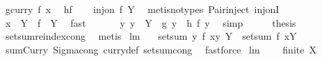 \begin{isabellebody}
\ {\isacharquery}g{\isacharequal}{\isachardoublequoteopen}{\isacharparenleft}curry\ f{\isacharparenright}\ x{\isachardoublequoteclose}\ \isamarkupfalse%
\ {\isacharquery}h{\isacharequal}f\isanewline
\ \ \isamarkupfalse%
\ {\isachardoublequoteopen}inj{\isacharunderscore}on\ {\isacharquery}f\ Y{\isachardoublequoteclose}\ \isamarkupfalse%
\ {\isacharparenleft}metis{\isacharparenleft}no{\isacharunderscore}types{\isacharparenright}\ Pair{\isacharunderscore}inject\ inj{\isacharunderscore}onI{\isacharparenright}\ \isanewline
\ \ \isamarkupfalse%
\ \isamarkupfalse%
\ {\isachardoublequoteopen}{\isacharbraceleft}x{\isacharbraceright}\ {\isasymtimes}\ Y\ {\isacharequal}\ {\isacharquery}f\ {\isacharbackquote}\ Y{\isachardoublequoteclose}\ \isamarkupfalse%
\ fast\isanewline
\ \ \isamarkupfalse%
\ \isamarkupfalse%
\ {\isachardoublequoteopen}{\isasymforall}\ y{\isachardot}\ y\ {\isasymin}\ Y\ {\isasymlongrightarrow}\ {\isacharquery}g\ y\ {\isacharequal}\ {\isacharquery}h\ {\isacharparenleft}{\isacharquery}f\ y{\isacharparenright}{\isachardoublequoteclose}\ \isamarkupfalse%
\ simp\isanewline
\ \ \isamarkupfalse%
\ \isamarkupfalse%
\ {\isacharquery}thesis\ \isamarkupfalse%
\ setsum{\isachardot}reindex{\isacharunderscore}cong\ \isamarkupfalse%
\ metis\isanewline
{}\isamarkupfalse%
%
\endisatagproof
{\isafoldproof}%
%
\isadelimproof
\isanewline
%
\endisadelimproof
\isanewline
{}\isamarkupfalse%
\ lm{}{}{}{\isacharcolon}\ \isanewline
\ \ {\isachardoublequoteopen}setsum\ {\isacharparenleft}{\isacharpercent}y{\isachardot}\ f\ {\isacharparenleft}x{\isacharcomma}y{\isacharparenright}{\isacharparenright}\ Y\ {\isacharequal}\ setsum\ f\ {\isacharparenleft}{\isacharbraceleft}x{\isacharbraceright}{\isasymtimes}Y{\isacharparenright}{\isachardoublequoteclose}\ \isanewline
%
\isadelimproof
\ \ %
\endisadelimproof
%
\isatagproof
{}\isamarkupfalse%
\ sumCurry\ Sigma{\isacharunderscore}cong\ curry{\isacharunderscore}def\ setsum{\isachardot}cong\ \isamarkupfalse%
\ fastforce%
\endisatagproof
{\isafoldproof}%
%
\isadelimproof
\isanewline
%
\endisadelimproof
\isanewline
{}\isamarkupfalse%
\ lm{}{}{}{\isacharcolon}\ \isanewline
\ \ \ {\isachardoublequoteopen}finite\ X{\isachardoublequoteclose}\ \isanewline

\end{isabellebody}
